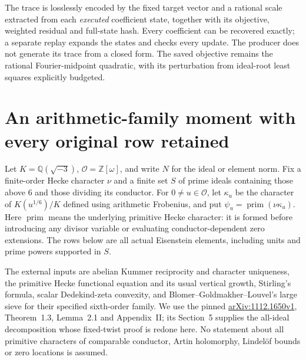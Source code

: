 \documentclass[11pt]{article}
\theoremstyle{definition}\newtheorem{definition}[theorem]{Definition}
\theoremstyle{remark}\newtheorem{remark}[theorem]{Remark}
\begin{document}
The trace is losslessly encoded by the fixed target vector and a rational
scale extracted from each \emph{executed} coefficient state, together with
its objective, weighted residual and full-state hash. Every coefficient
can be recovered exactly; a separate replay expands the states and checks
every update. The producer does not generate its trace from a closed form.
The saved objective remains the rational Fourier-midpoint quadratic, with
its perturbation from ideal-root least squares explicitly budgeted.

\section{An arithmetic-family moment with every original row retained}
\label{mm:core}
Let $K=\mathbb Q(\sqrt{-3})$, $\mathcal O=\mathbb Z[\omega]$, and write
$N$ for the ideal or element norm. Fix a finite-order Hecke character
$\nu$ and a finite set $S$ of prime ideals containing those above $6$ and
those dividing its conductor. For $0\ne u\in\mathcal O$, let $\kappa_u$
be the character of $K(u^{1/6})/K$ defined using arithmetic Frobenius, and
put $\psi_u=\operatorname{prim}(\nu\kappa_u)$. Here
$\operatorname{prim}$ means the underlying primitive Hecke character:
it is formed before introducing any divisor variable or evaluating
conductor-dependent zero extensions. The rows below are all actual
Eisenstein elements, including units and prime powers supported in $S$.

The external inputs are abelian Kummer reciprocity and character
uniqueness, the primitive Hecke functional equation and its usual
vertical growth, Stirling's formula, scalar Dedekind-zeta convexity, and
Blomer--Goldmakher--Louvel's large sieve for their specified sixth-order
family. We use the pinned
\href{https://arxiv.org/pdf/1112.1650v1}{arXiv:1112.1650v1},
Theorem~1.3, Lemma~2.1 and Appendix~II; its Section~5 supplies the
all-ideal decomposition whose fixed-twist proof is redone here.
No statement about all primitive characters of comparable conductor,
Artin holomorphy, Lindel\"of bounds or zero locations is assumed.
\end{document}
